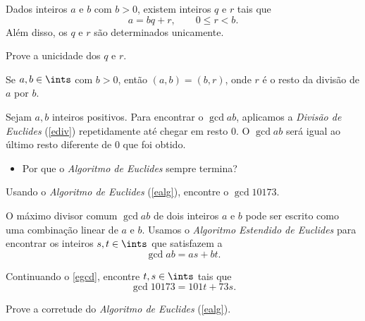 \begin{definition}
\label{ediv}
%
    Dados inteiros $a$ e $b$ com $b > 0$, existem inteiros $q$ e $r$ tais que
    $$
        a = bq + r, \qquad 0 \leq r < b.
    $$
    Além disso, os $q$ e $r$ são determinados unicamente.
\end{definition}

\begin{exercise}
%
    Prove a unicidade dos $q$ e $r$.
\end{exercise}

\begin{exercise}
%
    Se $a, b\in\ints$ com $b > 0$, então $(a,b) = (b,r)$, onde $r$ é o resto da divisão de $a$ por $b$.
\end{exercise}

\begin{definition}
\label{ealg}
%
    Sejam $a, b$ inteiros positivos. Para encontrar o $\gcd a b$, aplicamos a \emph{Divisão de Euclides} (\ref{ediv}) repetidamente até chegar em resto 0. O $\gcd a b$ será igual ao último resto diferente de 0 que foi obtido.
    \begin{itemize}[--]
        \item Por que o \emph{Algoritmo de Euclides} sempre termina? 
    \end{itemize}
\end{definition}

\begin{exercise}
\label{egcd}
%
    Usando o \emph{Algoritmo de Euclides} (\ref{ealg}), encontre o $\gcd {101} {73}$.
\end{exercise}

\begin{definition}
%
    O máximo divisor comum $\gcd a b$ de dois inteiros $a$ e $b$ pode ser escrito como uma combinação linear de $a$ e $b$. Usamos o \emph{Algoritmo Estendido de Euclides} para encontrar os inteiros $s, t\in\ints$ que satisfazem a
    $$
        \gcd a b = as + bt.
    $$
\end{definition}

\begin{exercise}
%
    Continuando o \ref{egcd}, encontre $t,s\in\ints$ tais que
    $$
        \gcd {101} {73} = 101t + 73s.
    $$
\end{exercise}

\begin{homework}
%
    Prove a corretude do \emph{Algoritmo de Euclides} (\ref{ealg}).
\end{homework}

